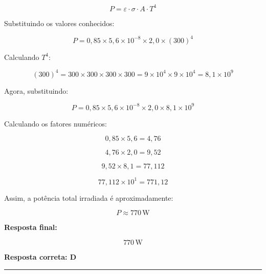 \documentclass[a4paper,12pt]{article}
\begin{document}
\begin{flushleft}
\[
\boxed{
P = \varepsilon \cdot \sigma \cdot A \cdot T^4
}
\]

\bigskip

Substituindo os valores conhecidos:

\[
P = 0,85 \times 5,6 \times 10^{-8} \times 2,0 \times (300)^4
\]

\bigskip

Calculando $T^4$:

\[
(300)^4 = 300 \times 300 \times 300 \times 300 = 9 \times 10^4 \times 9 \times 10^4 = 8,1 \times 10^9
\]

\bigskip

Agora, substituindo:

\[
P = 0,85 \times 5,6 \times 10^{-8} \times 2,0 \times 8,1 \times 10^9
\]

\bigskip

Calculando os fatores numéricos:

\[
0,85 \times 5,6 = 4,76
\]

\[
4,76 \times 2,0 = 9,52
\]

\[
9,52 \times 8,1 = 77,112
\]

\[
77,112 \times 10^1 = 771,12
\]

\bigskip

Assim, a potência total irradiada é aproximadamente:

\[
P \approx 770 \, \text{W}
\]

\bigskip

\textbf{Resposta final:}

\[
\boxed{770 \, \text{W}}
\]

\textbf{Resposta correta: \colorbox{green!50}{D}}

\end{flushleft}
\noindent\rule{\linewidth}{0.6pt}\\
\end{document}
